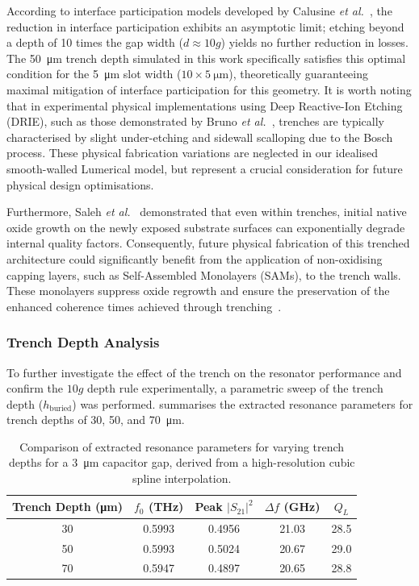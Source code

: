 \documentclass[12pt,a4paper]{article}
\begin{document}
According to interface participation models developed by Calusine \textit{et al.}~\cite{Calusine2018}, the reduction in interface participation exhibits an asymptotic limit; etching beyond a depth of 10 times the gap width ($d \approx 10g$) yields no further reduction in losses. The \SI{50}{\micro\metre} trench depth simulated in this work specifically satisfies this optimal condition for the \SI{5}{\micro\metre} slot width ($10 \times \SI{5}{\micro\metre}$), theoretically guaranteeing maximal mitigation of interface participation for this geometry. It is worth noting that in experimental physical implementations using Deep Reactive-Ion Etching (DRIE), such as those demonstrated by Bruno \textit{et al.}~\cite{Bruno2015}, trenches are typically characterised by slight under-etching and sidewall scalloping due to the Bosch process. These physical fabrication variations are neglected in our idealised smooth-walled Lumerical model, but represent a crucial consideration for future physical design optimisations.

Furthermore, Saleh \textit{et al.}~\cite{Saleh2026} demonstrated that even within trenches, initial native oxide growth on the newly exposed substrate surfaces can exponentially degrade internal quality factors. Consequently, future physical fabrication of this trenched architecture could significantly benefit from the application of non-oxidising capping layers, such as Self-Assembled Monolayers (SAMs), to the trench walls. These monolayers suppress oxide regrowth and ensure the preservation of the enhanced coherence times achieved through trenching~\cite{Saleh2026}.

\subsubsection{Trench Depth Analysis}

To further investigate the effect of the trench on the resonator performance and confirm the $10g$ depth rule experimentally, a parametric sweep of the trench depth ($h_{\mathrm{buried}}$) was performed.  summarises the extracted resonance parameters for trench depths of 30, 50, and \SI{70}{\micro\metre}.

\begin{table}[ht]
    \centering
    \begin{tabular}{ccccc}
        \toprule
        \textbf{Trench Depth} (\si{\micro\metre}) & \boldmath$f_0$ \textbf{(\si{\tera\hertz})} & \textbf{Peak} \boldmath$|S_{21}|^2$ & \boldmath$\Delta f$ \textbf{(\si{\giga\hertz})} & \boldmath$Q_L$ \\
        \midrule
        30 & 0.5993 & 0.4956 & 21.03 & 28.5 \\
        50 & 0.5993 & 0.5024 & 20.67 & 29.0 \\
        70 & 0.5947 & 0.4897 & 20.65 & 28.8 \\
        \bottomrule
    \end{tabular}
    \caption{Comparison of extracted resonance parameters for varying trench depths for a \SI{3}{\micro\metre} capacitor gap, derived from a high-resolution cubic spline interpolation.}
    \label{tab:trench_depth_sweep}
\end{table}
\end{document}
